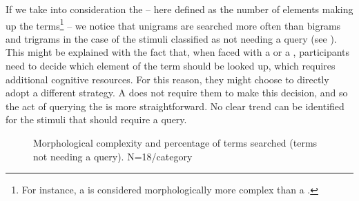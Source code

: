 \documentclass[output=paper]{langsci/langscibook}
\begin{document}
If we take into consideration the  -- here defined as the number of elements making up the terms\footnote{For instance, a  is considered morphologically more complex than a .} --  we notice that unigrams are searched more often than bigrams and trigrams in the case of the stimuli classified as not needing a query (see ). This might be explained with the fact that, when faced with a  or a , participants need to decide which element of the term should be looked up, which requires additional cognitive resources. For this reason, they might choose to directly adopt a different strategy. A  does not require them to make this decision, and so the act of querying the  is more straightforward. No clear trend can be identified for the stimuli that should require a query.

\begin{figure}
\caption{Morphological complexity and percentage of terms searched (terms not needing a query). N=18/category \label{fig:prandi:11}}
\end{figure}
\end{document}
